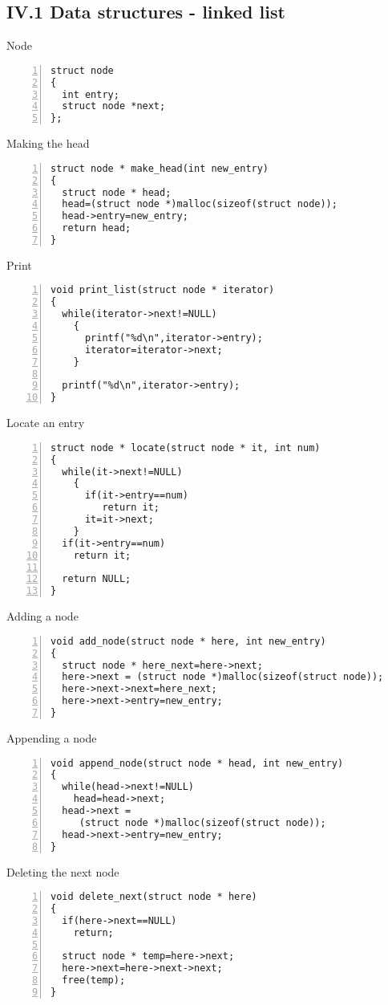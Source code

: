 \documentclass{beamer}
\begin{document}
\subsection*{IV.1 Data structures - linked list}
\begin{frame}[fragile]{Node}
\begin{lstlisting}[numbers=left]
struct node
{
  int entry;
  struct node *next;
};
\end{lstlisting}
\end{frame}
\begin{frame}[fragile]{Making the head}
\begin{lstlisting}[numbers=left]
struct node * make_head(int new_entry)
{
  struct node * head;
  head=(struct node *)malloc(sizeof(struct node));
  head->entry=new_entry;
  return head;
}
\end{lstlisting}
\end{frame}
\begin{frame}[fragile]{Print}
\begin{lstlisting}[numbers=left]
void print_list(struct node * iterator)
{
  while(iterator->next!=NULL)
    {
      printf("%d\n",iterator->entry);
      iterator=iterator->next;
    }

  printf("%d\n",iterator->entry);
}
\end{lstlisting}
\end{frame}
\begin{frame}[fragile]{Locate an entry}
\begin{lstlisting}[numbers=left]
struct node * locate(struct node * it, int num)
{
  while(it->next!=NULL)
    {
      if(it->entry==num)
         return it;
      it=it->next;
    }
  if(it->entry==num)
    return it;

  return NULL;
}
\end{lstlisting}
\end{frame}
\begin{frame}[fragile]{Adding a node}
\begin{lstlisting}[numbers=left]
void add_node(struct node * here, int new_entry)
{
  struct node * here_next=here->next;
  here->next = (struct node *)malloc(sizeof(struct node));
  here->next->next=here_next;
  here->next->entry=new_entry;
}
\end{lstlisting}
\end{frame}
\begin{frame}[fragile]{Appending a node}
\begin{lstlisting}[numbers=left]
void append_node(struct node * head, int new_entry)
{
  while(head->next!=NULL)
    head=head->next;
  head->next = 
     (struct node *)malloc(sizeof(struct node));
  head->next->entry=new_entry;
}
\end{lstlisting}
\end{frame}
\begin{frame}[fragile]{Deleting the next node}
\begin{lstlisting}[numbers=left]
void delete_next(struct node * here)
{
  if(here->next==NULL)
    return;

  struct node * temp=here->next;
  here->next=here->next->next;
  free(temp);
}
\end{lstlisting}
\end{frame}
\end{document}
